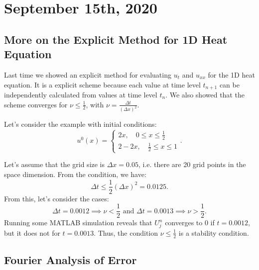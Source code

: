 \documentclass[../main/main.tex]{subfiles}
\begin{document}
\section{September 15th, 2020}
\subsection{More on the Explicit Method for 1D Heat Equation}
Last time we showed an explicit method for evaluating $u_t$ and  $u_{xx}$ for the 1D heat equation. It is a explicit scheme because each value at time level $t_{n+1}$ can be independently calculated from values at time level $t_n$. We also showed that the scheme converges for $\nu \le  \frac{1}{2}$, with $\nu = \frac{\Delta t}{(\Delta x)^2}$. 

Let's consider the example with initial conditions: \[
    u^{0}(x) = \begin{cases}
        2x, \quad 0 \le  x \le  \frac{1}{2} \\
        2-2x, \quad \frac{1}{2} \le  x \le  1
    \end{cases}
.\] 

\begin{center} 
\end{center}

Let's assume that the grid size is $\Delta x = 0.05$, i.e. there are 20 grid points in the space dimension. From the condition, we have: \[
    \Delta t \le  \frac{1}{2} \left( \Delta x \right)^2 = 0.0125
.\] From this, let's consider the cases: \[
\Delta t = 0.0012 \implies \nu < \frac{1}{2} \text{ and } \Delta t = 0.0013 \implies \nu > \frac{1}{2}
.\] Running some MATLAB simulation reveals that $U^n_j$ converges to 0 if $t = 0.0012$, but it does not for $t = 0.0013$. Thus, the condition $\nu \le \frac{1}{2}$ is a stability condition.

\subsection{Fourier Analysis of Error}
\end{document}
